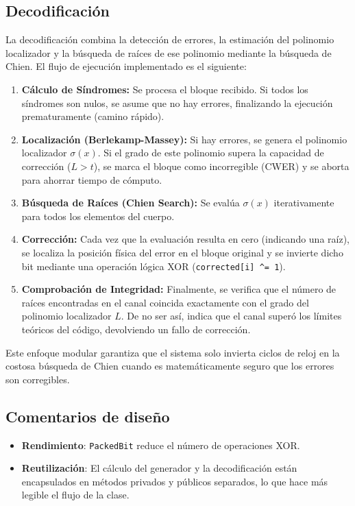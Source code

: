 \subsection{Decodificación}

La decodificación combina la detección de errores, la estimación del polinomio localizador y la búsqueda de raíces de ese polinomio mediante la búsqueda de Chien. El flujo de ejecución implementado es el siguiente:

\begin{enumerate}
    \item \textbf{Cálculo de Síndromes:} Se procesa el bloque recibido. Si todos los síndromes son nulos, se asume que no hay errores, finalizando la ejecución prematuramente (camino rápido).
    \item \textbf{Localización (Berlekamp-Massey):} Si hay errores, se genera el polinomio localizador $\sigma(x)$. Si el grado de este polinomio supera la capacidad de corrección ($L > t$), se marca el bloque como incorregible (CWER) y se aborta para ahorrar tiempo de cómputo.
    \item \textbf{Búsqueda de Raíces (Chien Search):} Se evalúa $\sigma(x)$ iterativamente para todos los elementos del cuerpo. 
    \item \textbf{Corrección:} Cada vez que la evaluación resulta en cero (indicando una raíz), se localiza la posición física del error en el bloque original y se invierte dicho bit mediante una operación lógica XOR (\texttt{corrected[i] \textasciicircum{}= 1}).
    \item \textbf{Comprobación de Integridad:} Finalmente, se verifica que el número de raíces encontradas en el canal coincida exactamente con el grado del polinomio localizador $L$. De no ser así, indica que el canal superó los límites teóricos del código, devolviendo un fallo de corrección.
\end{enumerate}

Este enfoque modular garantiza que el sistema solo invierta ciclos de reloj en la costosa búsqueda de Chien cuando es matemáticamente seguro que los errores son corregibles.

\subsection{Comentarios de diseño}

\begin{itemize}
  \item \textbf{Rendimiento}: \texttt{PackedBit} reduce el número de operaciones XOR.
  \item \textbf{Reutilización}: El cálculo del generador y la decodificación están encapsulados en métodos privados y públicos separados, lo que hace más legible el flujo de la clase.
\end{itemize}

